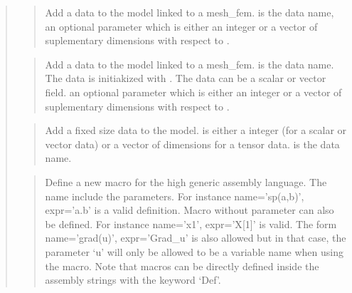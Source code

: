 \documentclass[a4paper,11pt,english]{sphinxmanual}
\begin{document}
\begin{quote}
\sphinxAtStartPar
{}
\begin{quote}

\sphinxAtStartPar
Add a data to the model linked to a mesh\_fem.  is the data name,
 an optional parameter which is either an
integer  or a vector of suplementary dimensions with respect to .
\end{quote}

\sphinxAtStartPar
{}
\begin{quote}

\sphinxAtStartPar
Add a data to the model linked to a mesh\_fem.  is the data name.
The data is initiakized with . The data can be a scalar or vector
field.  an optional parameter which is either an
integer or a vector of suplementary dimensions with respect to .
\end{quote}

\sphinxAtStartPar
{}
\begin{quote}

\sphinxAtStartPar
Add a fixed size data to the model.   is either a
integer (for a scalar or vector data) or a vector of dimensions
for a tensor data.  is the data name.
\end{quote}

\sphinxAtStartPar
{}
\begin{quote}

\sphinxAtStartPar
Define a new macro for the high generic assembly language.
The name include the parameters. For instance name=’sp(a,b)’, expr=’a.b’
is a valid definition. Macro without parameter can also be defined.
For instance name=’x1’, expr=’X{[}1{]}’ is valid. The form name=’grad(u)’,
expr=’Grad\_u’ is also allowed but in that case, the parameter ‘u’ will
only be allowed to be a variable name when using the macro. Note that
macros can be directly defined inside the assembly strings with the
keyword ‘Def’.
\end{quote}


\end{quote}
\end{document}
